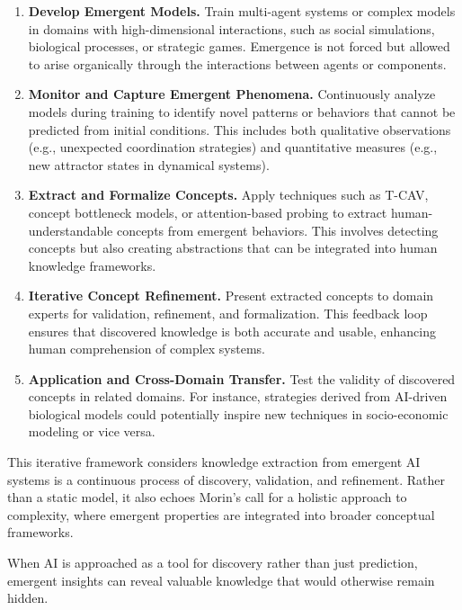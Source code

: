 \documentclass[11pt]{article}
\begin{document}
\begin{enumerate}
    \item \textbf{Develop Emergent Models.} Train multi-agent systems or complex models in domains with high-dimensional interactions, such as social simulations, biological processes, or strategic games. Emergence is not forced but allowed to arise organically through the interactions between agents or components. 

    \item \textbf{Monitor and Capture Emergent Phenomena.} Continuously analyze models during training to identify novel patterns or behaviors that cannot be predicted from initial conditions. This includes both qualitative observations (e.g., unexpected coordination strategies) and quantitative measures (e.g., new attractor states in dynamical systems).

    \item \textbf{Extract and Formalize Concepts.} Apply techniques such as T-CAV, concept bottleneck models, or attention-based probing to extract human-understandable concepts from emergent behaviors. This involves detecting concepts but also creating abstractions that can be integrated into human knowledge frameworks.

    \item \textbf{Iterative Concept Refinement.} Present extracted concepts to domain experts for validation, refinement, and formalization. This feedback loop ensures that discovered knowledge is both accurate and usable, enhancing human comprehension of complex systems.

    \item \textbf{Application and Cross-Domain Transfer.} Test the validity of discovered concepts in related domains. For instance, strategies derived from AI-driven biological models could potentially inspire new techniques in socio-economic modeling or vice versa.
\end{enumerate}

This iterative framework considers knowledge extraction from emergent AI systems is a continuous process of discovery, validation, and refinement. Rather than a static model, it also echoes Morin’s call for a holistic approach to complexity, where emergent properties are integrated into broader conceptual frameworks.

When AI is approached as a tool for discovery rather than just prediction, emergent insights can reveal valuable knowledge that would otherwise remain hidden. 
\end{document}
